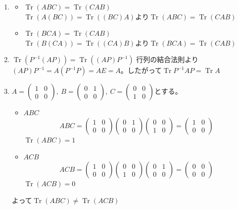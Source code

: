 \documentclass[dvipdfmx]{jsreport}
\DeclareMathOperator{\Tr}{Tr}
\newcounter{num}[section]
\begin{document}
\begin{answer}
\begin{enumerate}
	\item 
\begin{itemize}
	\item $\Tr{(ABC)}= \Tr{(CAB)}$\\
	$\Tr{(A(BC))}= \Tr{((BC)A)}$より$\Tr{(ABC)}= \Tr{(CAB)}$
	\item $\Tr{(BCA)}= \Tr{(CAB)}$\\
	$\Tr{(B(CA))}= \Tr{((CA)B)}$より$\Tr{(BCA)}= \Tr{(CAB)}$
\end{itemize}

	\item $\Tr{(P^{-1}(AP))}= \Tr{((AP)P^{-1})}$
	行列の結合法則より$(AP)P^{-1}= A(P^{-1}P)= AE= A$。したがって$\Tr{P^{-1}AP}= \Tr{A}$

	\item $A= \begin{pmatrix}1& 0\\ 0& 0\end{pmatrix},\ B= \begin{pmatrix}0& 1\\ 0& 0\end{pmatrix},\ C= \begin{pmatrix}0& 0\\ 1& 0\end{pmatrix}$とする。
\begin{itemize}
	\item $ABC$
\begin{equation*}
	ABC= \begin{pmatrix}1& 0\\ 0& 0\end{pmatrix}\begin{pmatrix}0& 1\\ 0& 0\end{pmatrix}\begin{pmatrix}0& 0\\ 1& 0\end{pmatrix}= \begin{pmatrix}1& 0\\ 0& 0\end{pmatrix}
\end{equation*}
	$\Tr{(ABC)}= 1$

	\item $ACB$
\begin{equation*}
	ACB= \begin{pmatrix}1& 0\\ 0& 0\end{pmatrix}\begin{pmatrix}0& 0\\ 1& 0\end{pmatrix}\begin{pmatrix}0& 1\\ 0& 0\end{pmatrix}= \begin{pmatrix}0& 0\\ 0& 0\end{pmatrix}
\end{equation*}
	$\Tr{(ACB)}= 0$
\end{itemize}
	よって$\Tr{(ABC)}\ne \Tr{(ACB)}$
\end{enumerate}
\end{answer}
\end{document}
